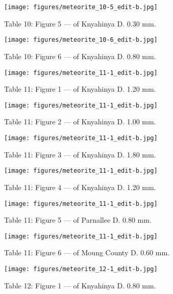 \documentclass[a4paper, 12pt, oneside]{article}
\begin{document}
\clearpage
\begin{figure}[t]
\texttt{[image: figures/meteorite\_10-5\_edit-b.jpg]}
\caption{Table 10: Figure 5 --- of Knyahinya D. 0.30 mm.}
\centering
\end{figure}
\clearpage
\begin{figure}[t]
\texttt{[image: figures/meteorite\_10-6\_edit-b.jpg]}
\caption{Table 10: Figure 6 --- of Knyahinya D. 0.80 mm.}
\centering
\end{figure}
\clearpage
\begin{figure}[t]
\texttt{[image: figures/meteorite\_11-1\_edit-b.jpg]}
\caption{Table 11: Figure 1 --- of Knyahinya D. 1.20 mm.}
\centering
\end{figure}
\clearpage
\begin{figure}[t]
\texttt{[image: figures/meteorite\_11-1\_edit-b.jpg]}
\caption{Table 11: Figure 2 --- of Knyahinya D. 1.00 mm.}
\centering
\end{figure}
\clearpage
\begin{figure}[t]
\texttt{[image: figures/meteorite\_11-1\_edit-b.jpg]}
\caption{Table 11: Figure 3 --- of Knyahinya D. 1.80 mm.}
\centering
\end{figure}
\clearpage
\begin{figure}[t]
\texttt{[image: figures/meteorite\_11-1\_edit-b.jpg]}
\caption{Table 11: Figure 4 --- of Knyahinya D. 1.20 mm.}
\centering
\end{figure}
\clearpage
\begin{figure}[t]
\texttt{[image: figures/meteorite\_11-1\_edit-b.jpg]}
\caption{Table 11: Figure 5 --- of Parnallee D. 0.80 mm.}
\centering
\end{figure}
\clearpage
\begin{figure}[t]
\texttt{[image: figures/meteorite\_11-1\_edit-b.jpg]}
\caption{Table 11: Figure 6 --- of Moung County D. 0.60 mm.}
\centering
\end{figure}
\clearpage
\begin{figure}[t]
\texttt{[image: figures/meteorite\_12-1\_edit-b.jpg]}
\caption{Table 12: Figure 1 --- of Knyahinya D. 0.80 mm.}
\centering
\end{figure}
\end{document}

